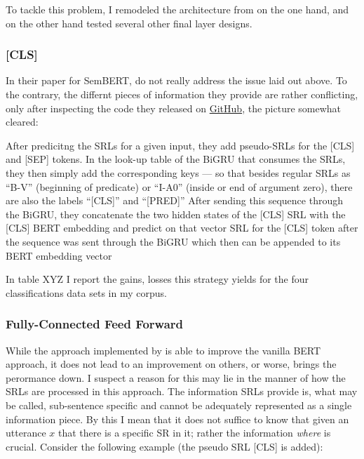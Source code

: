 To tackle this problem, I remodeled the architecture from \cite{zhang2019semantics} on the one
hand, and on the other hand tested several other final layer designs.

\subsubsection{[CLS]}

In their paper for SemBERT, \cite{zhang2019semantics} do not really address the
issue laid out above. To the contrary, the differnt pieces of information they
provide are rather conflicting, only after inspecting the code they released on
\href{https://github.com/cooelf/SemBERT/}{GitHub}, the picture somewhat cleared:

After predicitng the SRLs for a given input, they add pseudo-SRLs for the [CLS] and [SEP] tokens.
In the look-up table of the BiGRU that consumes the SRLs, they then simply add the corresponding
keys --- so that besides regular SRLs as ``B-V'' (beginning of predicate) or ``I-A0'' (inside
or end of argument zero), there are also the labels ``[CLS]'' and ``[PRED]'' After sending this
sequence through the BiGRU, they concatenate the two hidden states of the [CLS] SRL with the
[CLS] BERT embedding and predict on that vector %
SRL for the [CLS] token after the sequence was sent through the BiGRU which then can be appended
to its BERT embedding vector


In table XYZ I report the gains, losses this strategy yields for the four classifications data sets
in my corpus.

\subsubsection{Fully-Connected Feed Forward}

While the approach implemented by \cite{zhang2019semantics} is able to improve the vanilla
BERT approach, it does not lead to an improvement on others, or worse, brings the perormance
down. I suspect a reason for this may lie in the manner of how the SRLs are processed in this
approach. The information SRLs provide is, what may be called, sub-sentence specific and
cannot be adequately represented as a single information piece. By this I mean that it does
not suffice to know that given an utterance $x$ that there is a specific SR in it; rather the
information \emph{where} is crucial. Consider the following example (the pseudo SRL [CLS] is
added):


